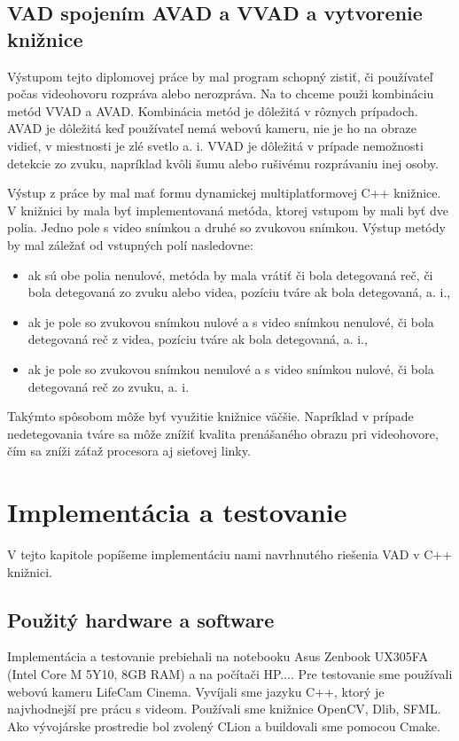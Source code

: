 \section{VAD spojením AVAD a VVAD a vytvorenie knižnice}
Výstupom tejto diplomovej práce by mal program schopný zistiť, či používateľ počas videohovoru rozpráva alebo nerozpráva. 
Na to chceme použi kombináciu metód VVAD a AVAD. 
Kombinácia metód je dôležitá v rôznych prípadoch. 
AVAD je dôležitá keď používateľ nemá webovú kameru, nie je ho na obraze vidieť, v miestnosti je zlé svetlo a. i.
VVAD je dôležitá v prípade nemožnosti detekcie zo zvuku, napríklad kvôli šumu alebo rušivému rozprávaniu inej osoby.

Výstup z práce by mal mať formu dynamickej multiplatformovej C++ knižnice. 
V knižnici by mala byť implementovaná metóda, ktorej vstupom by mali byť dve polia. 
Jedno pole s video snímkou a druhé so zvukovou snímkou.
Výstup metódy by mal záležať od vstupných polí nasledovne:
\begin{itemize}
	\item ak sú obe polia nenulové, metóda by mala vrátiť či bola detegovaná reč, či bola detegovaná zo zvuku alebo videa, pozíciu tváre ak bola detegovaná, a. i., 
	\item ak je pole so zvukovou snímkou nulové a s video snímkou nenulové, či bola detegovaná reč z videa, pozíciu tváre ak bola detegovaná, a. i.,
	\item ak je pole so zvukovou snímkou nenulové a s video snímkou nulové, či bola detegovaná reč zo zvuku, a. i.
\end{itemize}
Takýmto spôsobom môže byť využitie knižnice väčšie.
Napríklad v prípade nedetegovania tváre sa môže znížiť kvalita prenášaného obrazu pri videohovore, čím sa zníži záťaž procesora aj sieťovej linky.

\chapter{Implementácia a testovanie}
V tejto kapitole popíšeme implementáciu nami navrhnutého riešenia VAD v C++ knižnici.

\section{Použitý hardware a software}
Implementácia a testovanie prebiehali na notebooku Asus Zenbook UX305FA (Intel Core M 5Y10, 8GB RAM) a na počítači HP.... 
Pre testovanie sme používali webovú kameru LifeCam Cinema.
Vyvíjali sme jazyku C++, ktorý je najvhodnejší pre prácu s videom.
Používali sme knižnice OpenCV, Dlib, SFML.
Ako vývojárske prostredie bol zvolený CLion a buildovali sme pomocou Cmake.

